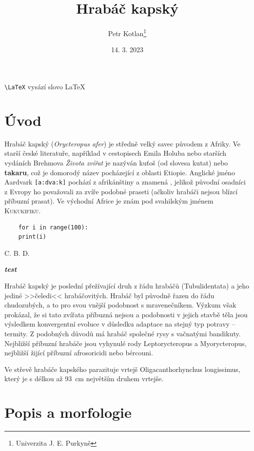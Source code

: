 \documentclass[a4paper, 12pt]{article}
\title{Hrabáč kapský}
\author{Petr Kotlan\thanks{Univerzita J. E. Purkyně}}
\date{14. 3. 2023}
\newcommand{\EPA}{{\LARGE C. B. D.}}
\newcommand{\zvyrazni}[1]{\textbf{\textit{#1}}}
\begin{document}
\maketitle

\tableofcontents

\verb#\LaTeX# vysází slovo \LaTeX


\section{Úvod}
Hrabáč kapský (\emph{Orycteropus afer}) je středně velký savec původem z Afriky. Ve starší české literatuře,
například v cestopisech Emila Holuba nebo starších vydáních Brehmova \textit{Života zvířat} je nazýván kuťoš (od slovesa kutat)
nebo \textbf{takaru}, což je domorodý název pocházející z oblasti Etiopie.
Anglické jméno Aardvark \texttt{[a:dva:k]} pochází z afrikánštiny a znamená ,
jelikož původní osadníci z Evropy ho považovali za zvíře podobné praseti
(ačkoliv hrabáči nejsou blízcí příbuzní prasat).
Ve východní Africe je znám pod svahilským jménem \textsc{Kukukifiku}.

\begin{verbatim}
    for i in range(100):
    print(i)
\end{verbatim}


\EPA

\zvyrazni{test}

\textsf{Hrabáč kapský} je poslední přežívající druh z řádu hrabáčů (Tubulidentata) a jeho jediné >>čeledi<< hrabáčovitých.
Hrabáč byl původně řazen do řádu chudozubých, a to pro svou vnější podobnost s mravenečníkem.
Výzkum však prokázal, že si tato zvířata příbuzná nejsou a podobnosti v jejich stavbě
těla jsou výsledkem konvergentní evoluce v důsledku adaptace na stejný typ potravy -- termity.
Z podobných důvodů má hrabáč společné rysy s vačnatými bandikuty. Nejbližší příbuzní hrabáče
jsou vyhynulé rody Leptorycteropus a Myorycteropus, nejbližší žijící příbuzní afrosoricidi nebo bércouni.

Ve střevě hrabáče kapského parazituje vrtejš Oligacanthorhynchus longissimus,
který je s délkou až 93~cm největším druhem vrtejše.

\section{Popis a morfologie}
\end{document}
